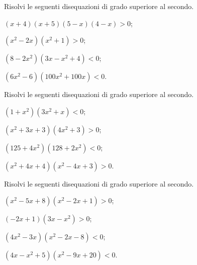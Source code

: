\begin{esercizio}[\Ast]
 \label{ese:4.37}
Risolvi le seguenti disequazioni di grado superiore al secondo.
\begin{multicols}{2}
\begin{enumeratea}
\item $(x+4)(x+5)(5-x)(4-x)>0$;
\item $(x^2-2x)(x^2+1)>0$;
\item $(8-2x^2)(3x-x^2+4)<0$;
\item $(6x^2-6)(100x^2+100x)<0$.
\end{enumeratea}
\end{multicols}
\end{esercizio}

\begin{esercizio}[\Ast]
 \label{ese:4.38}
Risolvi le seguenti disequazioni di grado superiore al secondo.
\begin{multicols}{2}
\begin{enumeratea}
\item $(1+x^2)(3x^2+x)<0$;
\item $(x^2+3x+3)(4x^2+3)>0$;
\item $(125+4x^2)(128+2x^2)<0$;
\item $(x^2+4x+4)(x^2-4x+3)>0$.
\end{enumeratea}
\end{multicols}
\end{esercizio}

\begin{esercizio}[\Ast]
 \label{ese:4.39}
Risolvi le seguenti disequazioni di grado superiore al secondo.
\begin{multicols}{2}
\begin{enumeratea}
\item $(x^2-5x+8)(x^2-2x+1)>0$;
\item $(-2x+1)(3x-x^2)>0$;
\item $(4x^2-3x)(x^2-2x-8)<0$;
\item $(4x-x^2+5)(x^2-9x+20)<0$.
\end{enumeratea}
\end{multicols}
\end{esercizio}

